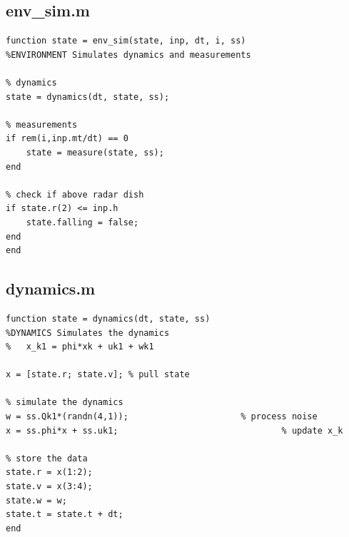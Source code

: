 \documentclass{article}
\begin{document}
\subsection{env\_sim.m}
\begin{lstlisting}[style=Matlab-editor]
function state = env_sim(state, inp, dt, i, ss)
%ENVIRONMENT Simulates dynamics and measurements

% dynamics
state = dynamics(dt, state, ss);

% measurements
if rem(i,inp.mt/dt) == 0
    state = measure(state, ss);
end 

% check if above radar dish
if state.r(2) <= inp.h
    state.falling = false;
end
end
\end{lstlisting}

\subsection{dynamics.m}
\begin{lstlisting}[style=Matlab-editor]
function state = dynamics(dt, state, ss)
%DYNAMICS Simulates the dynamics
%   x_k1 = phi*xk + uk1 + wk1

x = [state.r; state.v]; % pull state

% simulate the dynamics
w = ss.Qk1*(randn(4,1));                      % process noise 
x = ss.phi*x + ss.uk1;                                % update x_k

% store the data
state.r = x(1:2);
state.v = x(3:4);
state.w = w;
state.t = state.t + dt;
end
\end{lstlisting}
\end{document}
